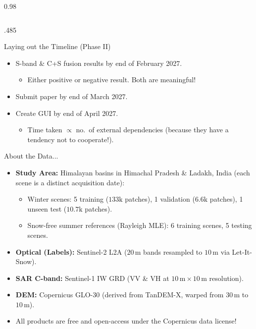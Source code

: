 \documentclass[final,svgnames,english]{beamer}
\begin{document}
\begin{frame}[fragile]{}
\begin{columns}[T]
\begin{column}{0.98\linewidth}
\begin{columns}[T]
\begin{column}{.485\linewidth}
          \begin{inriablock}{Laying out the Timeline (Phase II)}
            \begin{itemize}
                \item S-band \& C+S fusion results by end of February 2027.
                  \begin{itemize}
                    \item Either positive or negative result. Both are meaningful!
                  \end{itemize}
                \item Submit paper by end of March 2027.
                \item Create GUI by end of April 2027.
                  \begin{itemize}
                    \item Time taken $\propto$ no.\ of external dependencies (because they have a tendency not to cooperate!).
                  \end{itemize}
              \end{itemize}
          \end{inriablock}

          \begin{inriablock}{About the Data...}
            \begin{itemize}
              \item \textbf{Study Area:} Himalayan basins in Himachal Pradesh \& Ladakh, India (each scene is a distinct acquisition date):
                \begin{itemize}
                  \item Winter scenes: 5 training ($133\text{k}$ patches), 1 validation ($6.6\text{k}$ patches), 1 unseen test ($10.7\text{k}$ patches).
                  \item Snow-free summer references (Rayleigh MLE): 6 training scenes, 5 testing scenes.
                \end{itemize}
              \item \textbf{Optical (Labels):} Sentinel-2 L2A ($20\,\text{m}$ bands resampled to $10\,\text{m}$ via Let-It-Snow).
              \item \textbf{SAR C-band:} Sentinel-1 IW GRD (VV \& VH at $10\,\text{m} \times 10\,\text{m}$ resolution).
              \item \textbf{DEM:} Copernicus GLO-30 (derived from TanDEM-X, warped from $30\,\text{m}$ to $10\,\text{m}$).
              \item All products are free and open-access under the Copernicus data license!
            \end{itemize}
          \end{inriablock}


\end{column}
\end{columns}
\end{column}
\end{columns}
\end{frame}
\end{document}
